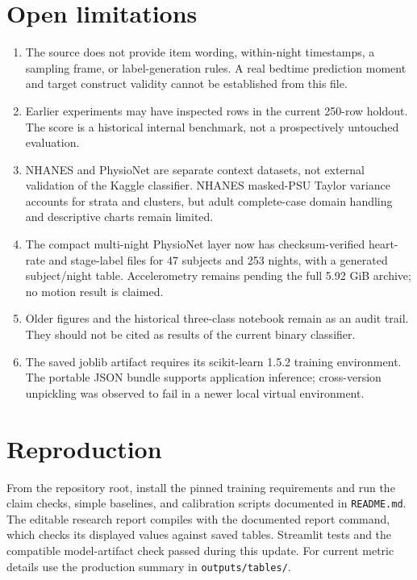 \documentclass[10pt,a4paper]{article}
\begin{document}
\section*{Open limitations}
\begin{enumerate}
\item The source does not provide item wording, within-night timestamps, a sampling frame, or label-generation rules. A real bedtime prediction moment and target construct validity cannot be established from this file.
\item Earlier experiments may have inspected rows in the current 250-row holdout. The score is a historical internal benchmark, not a prospectively untouched evaluation.
\item NHANES and PhysioNet are separate context datasets, not external validation of the Kaggle classifier. NHANES masked-PSU Taylor variance accounts for strata and clusters, but adult complete-case domain handling and descriptive charts remain limited.
\item The compact multi-night PhysioNet layer now has checksum-verified heart-rate and stage-label files for 47 subjects and 253 nights, with a generated subject/night table. Accelerometry remains pending the full 5.92 GiB archive; no motion result is claimed.
\item Older figures and the historical three-class notebook remain as an audit trail. They should not be cited as results of the current binary classifier.
\item The saved joblib artifact requires its scikit-learn 1.5.2 training environment. The portable JSON bundle supports application inference; cross-version unpickling was observed to fail in a newer local virtual environment.
\end{enumerate}

\section*{Reproduction}
From the repository root, install the pinned training requirements and run the claim checks, simple baselines, and calibration scripts documented in \texttt{README.md}. The editable research report compiles with the documented report command, which checks its displayed values against saved tables. Streamlit tests and the compatible model-artifact check passed during this update. For current metric details use the production summary in \texttt{outputs/tables/}.
\end{document}
